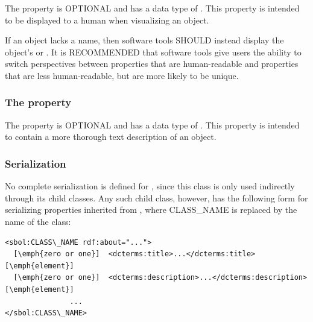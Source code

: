The  property is OPTIONAL and has a data type of . This property is intended to be displayed to a human when visualizing an  object.

If an  object lacks a name, then software tools SHOULD instead display the object's  or .
It is RECOMMENDED that software tools give users the ability to switch perspectives between  properties that are human-readable and  properties that are less human-readable, but are more likely to be unique.

\subsubsection*{The  property}
\label{sec:description}

The  property is OPTIONAL and has a data type of . This property is intended to contain a more thorough text description of an  object.

\subsubsection*{Serialization}

No complete serialization is defined for , since this
class is only used indirectly through its child classes.  Any such
child class, however, has the following form for serializing
properties inherited from , where CLASS\_NAME is
replaced by the name of the class:

\begin{lstlisting}
<sbol:CLASS\_NAME rdf:about="...">
  [\emph{zero or one}]  <dcterms:title>...</dcterms:title> [\emph{element}]
  [\emph{zero or one}]  <dcterms:description>...</dcterms:description> [\emph{element}]
               ...
</sbol:CLASS\_NAME>
\end{lstlisting}



